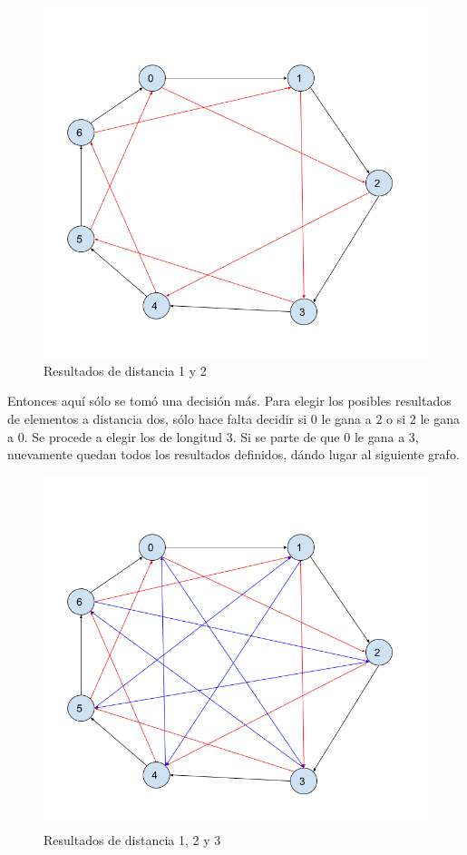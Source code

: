 \begin{figure}[H]
\centering
\includegraphics[width=14cm]{Imagenes/Ej4b.png}
\caption{Resultados de distancia 1 y 2}
\end{figure}

Entonces aquí sólo se tomó una decisión más. Para elegir los posibles resultados de elementos a distancia dos, sólo hace falta decidir si $0$ le gana a $2$ o si $2$ le gana a $0$. Se procede a elegir los de longitud 3. Si se parte de que $0$ le gana a $3$, nuevamente quedan todos los resultados definidos, dándo lugar al siguiente grafo.

\begin{figure}[H]
\centering
\includegraphics[width=14cm]{Imagenes/Ej4c.png}
\caption{Resultados de distancia 1, 2 y 3}
\end{figure}

